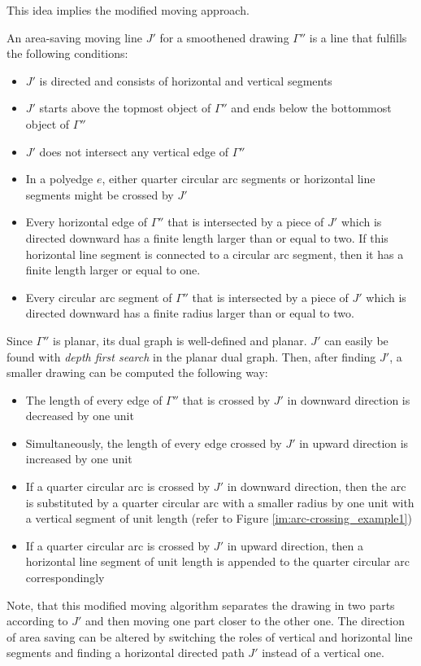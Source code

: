 This idea implies the modified moving approach.
\begin{definition}
	An area-saving moving line $J'$ for a smoothened drawing $\Gamma ''$ is a line that fulfills the following conditions:
	\begin{itemize}
		\item $J'$ is directed and consists of horizontal and vertical segments
		\item $J'$ starts above the topmost object of $\Gamma ''$ and ends below the bottommost object of $\Gamma ''$
		\item $J'$ does not intersect any vertical edge of $\Gamma ''$
		\item In a polyedge $e$, either quarter circular arc segments or horizontal line segments might be crossed by $J'$ 
		\item Every horizontal edge of $\Gamma''$ that is intersected by a piece of $J'$ which is directed downward has a finite length larger than or equal to two. If this horizontal line segment is connected to a circular arc segment, then it has a finite length larger or equal to one.
		\item Every circular arc segment of $\Gamma''$ that is intersected by a piece of $J'$ which is directed downward has a finite radius larger than or equal to two.
	\end{itemize}
\end{definition}
Since $\Gamma''$ is planar, its dual graph is well-defined and planar. $J'$ can easily be found with \textit{depth first search} in the planar dual graph. 
Then, after finding $J'$, a smaller drawing can be computed the following way:
\begin{itemize}
	\item The length of every edge of $\Gamma''$ that is crossed by $J'$ in downward direction is decreased by one unit
	\item Simultaneously, the length of every edge crossed by $J'$ in upward direction is increased by one unit
	\item If a quarter circular arc is crossed by $J'$ in downward direction, then the arc is substituted by a quarter circular arc with a smaller radius by one unit with a vertical segment of unit length (refer to Figure \ref{im:arc-crossing_example1})
	\item If a quarter circular arc is crossed by $J'$ in upward direction, then a horizontal line segment of unit length is appended to the quarter circular arc correspondingly
\end{itemize}
Note, that this modified moving algorithm separates the drawing in two parts according to $J'$ and then moving one part closer to the other one. The direction of area saving can be altered by switching the roles of vertical and horizontal line segments and finding a horizontal directed path $J'$ instead of a vertical one.
